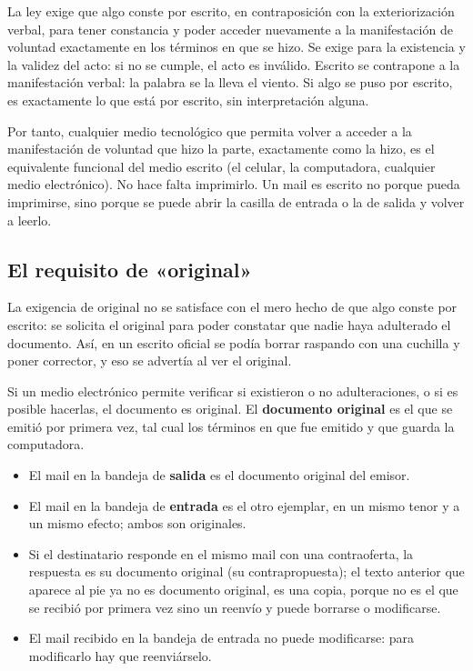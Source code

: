 \documentclass[12pt,oneside]{book}
\begin{document}
La ley exige que algo conste por escrito, en contraposición con la exteriorización verbal, para tener constancia y poder acceder nuevamente a la manifestación de voluntad exactamente en los términos en que se hizo. Se exige para la existencia y la validez del acto: si no se cumple, el acto es inválido. Escrito se contrapone a la manifestación verbal: la palabra se la lleva el viento. Si algo se puso por escrito, es exactamente lo que está por escrito, sin interpretación alguna.

Por tanto, cualquier medio tecnológico que permita volver a acceder a la manifestación de voluntad que hizo la parte, exactamente como la hizo, es el equivalente funcional del medio escrito (el celular, la computadora, cualquier medio electrónico). No hace falta imprimirlo. Un mail es escrito no porque pueda imprimirse, sino porque se puede abrir la casilla de entrada o la de salida y volver a leerlo.

\subsection{El requisito de «original»}

La exigencia de original no se satisface con el mero hecho de que algo conste por escrito: se solicita el original para poder constatar que nadie haya adulterado el documento. Así, en un escrito oficial se podía borrar raspando con una cuchilla y poner corrector, y eso se advertía al ver el original.

Si un medio electrónico permite verificar si existieron o no adulteraciones, o si es posible hacerlas, el documento es original. El \textbf{documento original} es el que se emitió por primera vez, tal cual los términos en que fue emitido y que guarda la computadora.

\begin{itemize}
    \item El mail en la bandeja de \textbf{salida} es el documento original del emisor.
    \item El mail en la bandeja de \textbf{entrada} es el otro ejemplar, en un mismo tenor y a un mismo efecto; ambos son originales.
    \item Si el destinatario responde en el mismo mail con una contraoferta, la respuesta es su documento original (su contrapropuesta); el texto anterior que aparece al pie ya no es documento original, es una copia, porque no es el que se recibió por primera vez sino un reenvío y puede borrarse o modificarse.
    \item El mail recibido en la bandeja de entrada no puede modificarse: para modificarlo hay que reenviárselo.
\end{itemize}
\end{document}
